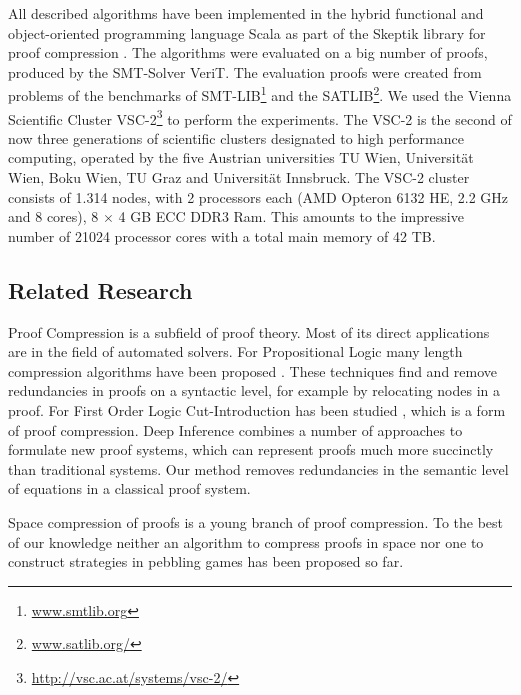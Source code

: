 All described algorithms have been implemented in the hybrid functional and object-oriented programming
language Scala as part of the Skeptik library for proof compression \cite{Boudou2014}.
The algorithms were evaluated on a big number of proofs, produced by the SMT-Solver VeriT.
The evaluation proofs were created from problems of the benchmarks of SMT-LIB\footnote{\url{www.smtlib.org}} and the SATLIB\footnote{\url{www.satlib.org/}}.
We used the Vienna Scientific Cluster VSC-2\footnote{\url{http://vsc.ac.at/systems/vsc-2/}} to perform the experiments.
The VSC-2 is the second of now three generations of scientific clusters designated to high performance computing, operated by the five Austrian universities TU Wien, Universit\"at Wien, Boku Wien, TU Graz and Universit\"at Innsbruck. 
The VSC-2 cluster consists of 1.314 nodes, with 2 processors each (AMD Opteron 6132 HE, 2.2 GHz and 8 cores), 8 $\times$ 4 GB ECC DDR3 Ram.
This amounts to the impressive number of 21024 processor cores with a total main memory of 42 TB.


\subsection{Related Research}

Proof Compression is a subfield of proof theory.
Most of its direct applications are in the field of automated solvers.
For Propositional Logic many length compression algorithms have been proposed \cite{Bar-Ilan2008,Bloem,Boudou2013,Cotton2010,Fontaine2011}.
These techniques find and remove redundancies in proofs on a syntactic level, for example by relocating nodes in a proof.
For First Order Logic Cut-Introduction has been studied \cite{Hetzl2012}, which is a form of proof compression.
Deep Inference \cite{Bruscoli2009} combines a number of approaches to formulate new proof systems, which can represent proofs much more succinctly than traditional systems.
Our method removes redundancies in the semantic level of equations in a classical proof system.

Space compression of proofs is a young branch of proof compression.
To the best of our knowledge neither an algorithm to compress proofs in space nor one to construct strategies in pebbling games has been proposed so far. 

